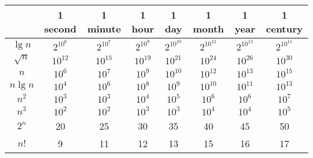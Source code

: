 \begin{center}
	\begin{tabular}{c|c|c|c|c|c|c|c}
		& 1 second & 1 minute & 1 hour & 1 day & 1 month & 1 year & 1 century  \\ \hline
		$\lg n$		& $2^{10^6}$ & $2^{10^7}$ & $2^{10^9}$  & $2^{10^{10}}$ & $2^{10^{12}}$ & $2^{10^{13}}$ & $2^{10^{15}}$ \\ \hline
		$\sqrt{n}$	& $10^{12}$ & $10^{15}$ & $10^{19}$ & $10^{21}$ & $10^{24}$ & $10^{26}$ & $10^{30}$ \\ \hline
		$n$			& $10^{6}$ & $10^{7}$ & $10^{9}$ & $10^{10}$ & $10^{12}$ & $10^{13}$ & $10^{15}$ \\ \hline
		$n \lg n$	& $10^{4}$ & $10^{6}$ & $10^{8}$ & $10^{9}$ & $10^{10}$ & $10^{11}$ & $10^{13}$ \\ \hline
		$n^2$		& $10^{3}$ & $10^{3}$ & $10^{4}$ & $10^{5}$ & $10^{6}$ & $10^{6}$ & $10^{7}$ \\ \hline
		$n^3$		& $10^{2}$ & $10^{2}$ & $10^{3}$ & $10^{3}$ & $10^{4}$ & $10^{4}$ & $10^{5}$ \\ \hline
		$2^n$		& 20 & 25 & 30 & 35 & 40 & 45 & 50 \\ \hline
		$n!$		& 9 & 11 & 12 & 13 & 15 & 16 & 17
	\end{tabular}
\end{center}
